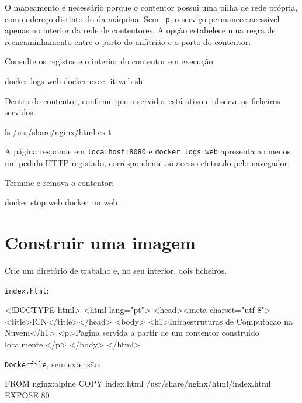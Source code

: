 \documentclass[11pt,a4paper]{article}
\begin{document}
O mapeamento é necessário porque o contentor possui uma pilha de rede própria, com endereço distinto do da máquina. Sem \texttt{-p}, o serviço permanece acessível apenas no interior da rede de contentores. A opção estabelece uma regra de reencaminhamento entre o porto do anfitrião e o porto do contentor.

Consulte os registos e o interior do contentor em execução:

\begin{terminal}
docker logs web
docker exec -it web sh
\end{terminal}

Dentro do contentor, confirme que o servidor está ativo e observe os ficheiros servidos:

\begin{terminal}
ls /usr/share/nginx/html
exit
\end{terminal}

\begin{verificar}
A página responde em \texttt{localhost:8080} e \texttt{docker logs web} apresenta ao menos um pedido HTTP registado, correspondente ao acesso efetuado pelo navegador.
\end{verificar}

Termine e remova o contentor:

\begin{terminal}
docker stop web
docker rm web
\end{terminal}

\section{Construir uma imagem}

Crie um diretório de trabalho e, no seu interior, dois ficheiros.

\texttt{index.html}:

\begin{terminal}
<!DOCTYPE html>
<html lang="pt">
<head><meta charset="utf-8"><title>ICN</title></head>
<body>
  <h1>Infraestruturas de Computacao na Nuvem</h1>
  <p>Pagina servida a partir de um contentor construido localmente.</p>
</body>
</html>
\end{terminal}

\texttt{Dockerfile}, sem extensão:

\begin{terminal}
FROM nginx:alpine
COPY index.html /usr/share/nginx/html/index.html
EXPOSE 80
\end{terminal}
\end{document}
